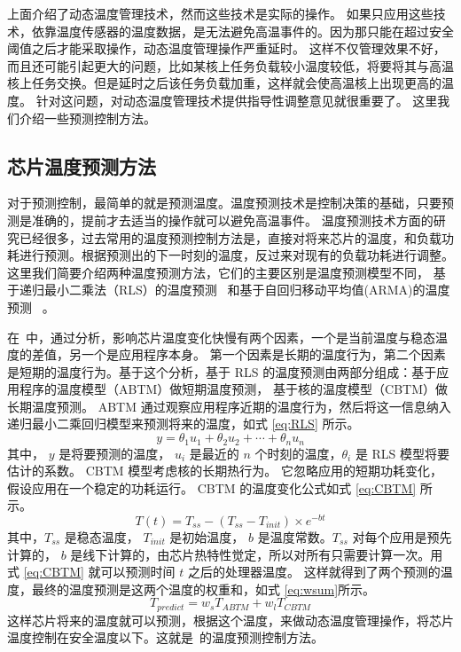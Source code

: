 上面介绍了动态温度管理技术，然而这些技术是实际的操作。
如果只应用这些技术，依靠温度传感器的温度数据，是无法避免高温事件的。因为那只能在超过安全阈值之后才能采取操作，动态温度管理操作严重延时。
这样不仅管理效果不好，而且还可能引起更大的问题，比如某核上任务负载较小温度较低，将要将其与高温核上任务交换。但是延时之后该任务负载加重，这样就会使高温核上出现更高的温度。
针对这问题，对动态温度管理技术提供指导性调整意见就很重要了。
这里我们介绍一些预测控制方法。
\subsection{芯片温度预测方法}\label{sec:temperature}
对于预测控制，最简单的就是预测温度。温度预测技术是控制决策的基础，只要预测是准确的，提前才去适当的操作就可以避免高温事件。
温度预测技术方面的研究已经很多，过去常用的温度预测控制方法是，直接对将来芯片的温度，和负载功耗进行预测。根据预测出的下一时刻的温度，反过来对现有的负载功耗进行调整。
这里我们简要介绍两种温度预测方法，它们的主要区别是温度预测模型不同，
基于递归最小二乘法（RLS）的温度预测~ 和基于自回归移动平均值(ARMA)的温度预测~ 。

在~\cite{yeo2008predictive}中，通过分析，影响芯片温度变化快慢有两个因素，一个是当前温度与稳态温度的差值，另一个是应用程序本身。
第一个因素是长期的温度行为，第二个因素是短期的温度行为。基于这个分析，基于 RLS 的温度预测由两部分组成：基于应用程序的温度模型（ABTM）做短期温度预测，
基于核的温度模型（CBTM）做长期温度预测。 ABTM 通过观察应用程序近期的温度行为，然后将这一信息纳入递归最小二乘回归模型来预测将来的温度，如式 \eqref{eq:RLS} 所示。
\begin{equation}\label{eq:RLS}
y = \theta_1u_1 + \theta_2u_2 + \cdots + \theta_nu_n
\end{equation}
其中， $y$ 是将要预测的温度， $u_i$ 是最近的 $n$ 个时刻的温度，$\theta_i$ 是 RLS 模型将要估计的系数。 CBTM 模型考虑核的长期热行为。
它忽略应用的短期功耗变化，假设应用在一个稳定的功耗运行。 CBTM 的温度变化公式如式 \eqref{eq:CBTM} 所示。
\begin{equation}\label{eq:CBTM}
T(t) = T_{ss} -(T_{ss} - T_{init}) \times e^{-bt}
\end{equation}
其中，$T_{ss}$ 是稳态温度， $T_{init}$ 是初始温度， $b$ 是温度常数。$T_{ss}$ 对每个应用是预先计算的，  
$b$ 是线下计算的，由芯片热特性觉定，所以对所有只需要计算一次。用式 \eqref{eq:CBTM} 就可以预测时间 $t$ 之后的处理器温度。
这样就得到了两个预测的温度，最终的温度预测是这两个温度的权重和，如式 \eqref{eq:wsum}所示。
\begin{equation}\label{eq:wsum}
T_{predict} = w_sT_{ABTM} + w_lT_{CBTM}
\end{equation}
这样芯片将来的温度就可以预测，根据这个温度，来做动态温度管理操作，将芯片温度控制在安全温度以下。这就是~\cite{yeo2008predictive}的温度预测控制方法。

